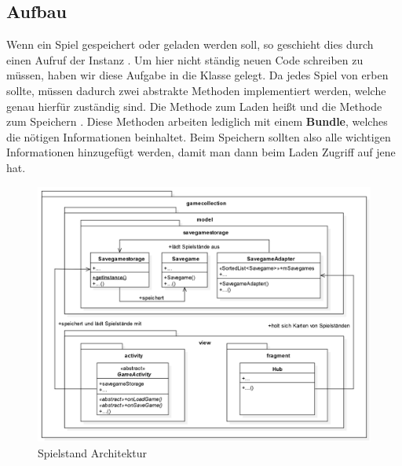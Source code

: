 \subsection{Aufbau}

Wenn ein Spiel gespeichert oder geladen werden soll, so geschieht dies durch
einen Aufruf der Instanz . Um hier nicht ständig neuen
Code schreiben zu müssen, haben wir diese Aufgabe in die Klasse
 gelegt. Da jedes Spiel von  erben sollte,
müssen dadurch zwei abstrakte Methoden implementiert werden, welche genau
hierfür zuständig sind. Die Methode zum Laden heißt  und die
Methode zum Speichern . Diese Methoden arbeiten lediglich mit
einem \textbf{Bundle}, welches die nötigen Informationen beinhaltet. Beim
Speichern sollten also alle wichtigen Informationen hinzugefügt werden, damit
man dann beim Laden Zugriff auf jene hat.

\begin{figure}[h]
	\centering
	\includegraphics[width=1.0\textwidth]{resources/savegamestorage/Savegamestorage}
	\caption{Spielstand Architektur}
\end{figure}
